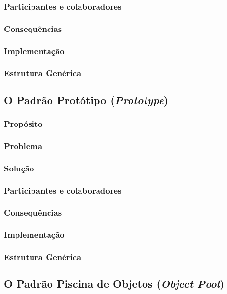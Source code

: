 \documentclass[
	11pt,				%
	openright,
	twoside,			%
	a4paper,			%
	english,			%
	french,
	brazil,				%
	sumario=tradicional
	]{abntex2}
\begin{document}
\subsubsection{Participantes e colaboradores}
\subsubsection{Consequências}
\subsubsection{Implementação}
\subsubsection{Estrutura Genérica}

\subsection{O Padrão Protótipo (\textit{Prototype})}
\subsubsection{Propósito}
\subsubsection{Problema}
\subsubsection{Solução}
\subsubsection{Participantes e colaboradores}
\subsubsection{Consequências}
\subsubsection{Implementação}
\subsubsection{Estrutura Genérica}

\subsection{O Padrão Piscina de Objetos (\textit{Object Pool})}
\end{document}
